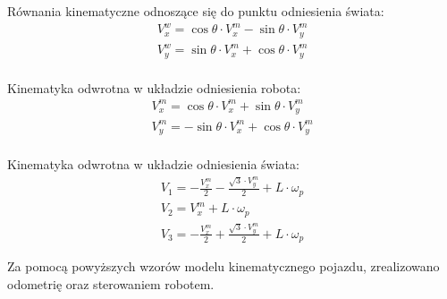 Równania kinematyczne odnoszące się do punktu odniesienia świata:
\begin{gather*}
 V_x^w = \cos{\theta} \cdot V_x^m - \sin{\theta} \cdot V_y^m\\
 V_y^w = \sin{\theta} \cdot V_x^m + \cos{\theta} \cdot V_y^m\\
\end{gather*}

Kinematyka odwrotna w układzie odniesienia robota:
\begin{gather*}
 V_x^m = \cos{\theta} \cdot V_x^m + \sin{\theta} \cdot V_y^m\\
 V_y^m = -\sin{\theta} \cdot V_x^m + \cos{\theta} \cdot V_y^m\\
\end{gather*}

Kinematyka odwrotna w układzie odniesienia świata:
\begin{gather*}
 V_1 = - \frac{V_x^m}{2} - \frac{\sqrt{3} \cdot V_y^m}{2} + L \cdot \omega_p \\
 V_2 = V_x^m + L \cdot \omega_p \\
 V_3 = - \frac{V_x^m}{2} + \frac{\sqrt{3} \cdot V_y^m}{2} + L \cdot \omega_p
\end{gather*}

Za pomocą powyższych wzorów modelu kinematycznego pojazdu, zrealizowano
odometrię oraz sterowaniem robotem.
